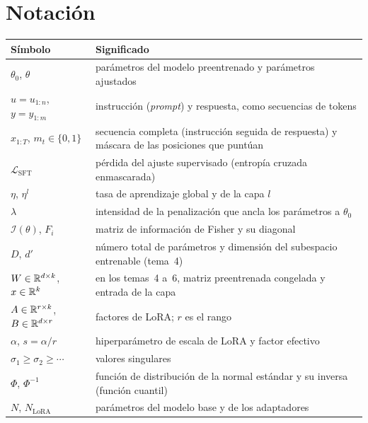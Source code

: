 \documentclass[11pt,a4paper,twoside,openany]{book}
\newcommand{\Lsft}{\mathcal{L}_{\mathrm{SFT}}}
\newcommand{\Fis}{\mathcal{I}}
\begin{document}
\section*{Notación}
\begin{center}\small
\begin{tabularx}{\textwidth}{@{}l>{\raggedright\arraybackslash}X@{}}
\toprule
Símbolo & Significado \\
\midrule
$\theta_0$, $\theta$ & parámetros del modelo preentrenado y parámetros ajustados \\
$u=u_{1:n}$, $y=y_{1:m}$ & instrucción (\emph{prompt}) y respuesta, como secuencias de tokens \\
$x_{1:T}$, $m_t\in\{0,1\}$ & secuencia completa (instrucción seguida de respuesta) y máscara de las posiciones que puntúan \\
$\Lsft$ & pérdida del ajuste supervisado (entropía cruzada enmascarada) \\
$\eta$, $\eta^{l}$ & tasa de aprendizaje global y de la capa $l$ \\
$\lambda$ & intensidad de la penalización que ancla los parámetros a $\theta_0$ \\
$\Fis(\theta)$, $F_i$ & matriz de información de Fisher y su diagonal \\
$D$, $d'$ & número total de parámetros y dimensión del subespacio entrenable (tema~4) \\
$W\in\mathbb{R}^{d\times k}$, $x\in\mathbb{R}^{k}$ & en los temas~4 a~6, matriz preentrenada congelada y entrada de la capa \\
$A\in\mathbb{R}^{r\times k}$, $B\in\mathbb{R}^{d\times r}$ & factores de LoRA; $r$ es el rango \\
$\alpha$, $s=\alpha/r$ & hiperparámetro de escala de LoRA y factor efectivo \\
$\sigma_1\ge\sigma_2\ge\cdots$ & valores singulares \\
$\Phi$, $\Phi^{-1}$ & función de distribución de la normal estándar y su inversa (función cuantil) \\
$N$, $N_{\mathrm{LoRA}}$ & parámetros del modelo base y de los adaptadores \\
\bottomrule
\end{tabularx}
\end{center}


\tableofcontents

\mainmatter







\backmatter

\end{document}
